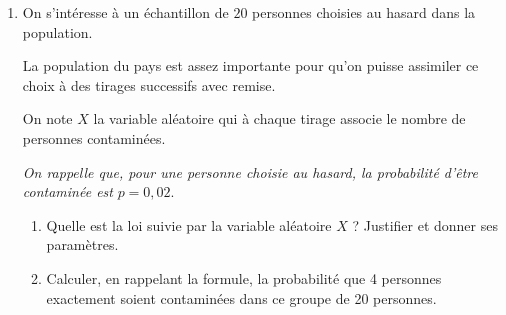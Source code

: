 \documentclass[10pt]{article}
\begin{document}
\begin{enumerate}
\begin{enumerate}
		\item \og Plus de 98\,\% de la population vaccinée n'a pas été contaminée.\fg{}
	\end{enumerate}
\item On s'intéresse à un échantillon de $20$ personnes choisies au hasard dans la population.

La population du pays est assez importante pour qu'on puisse assimiler ce choix à des tirages successifs avec remise.

On note $X$ la variable aléatoire qui à chaque tirage associe le nombre de personnes contaminées.

\emph{On rappelle que, pour une personne choisie au hasard, la probabilité d'être contaminée est} $p = 0,02$.
	\begin{enumerate}
		\item Quelle est la loi suivie par la variable aléatoire $X$ ? Justifier et donner ses paramètres.
		\item Calculer, en rappelant la formule, la probabilité que 4 personnes exactement soient contaminées dans ce groupe de 20 personnes.
	\end{enumerate}
\end{enumerate}

\bigskip
\end{document}
